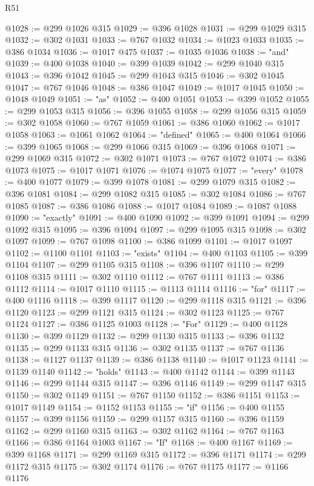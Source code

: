\begin{lexlean}{R51}
\begin{coremodule}
@1028 := @299 @1026 @315
@1029 := @396 @1028
@1031 := @299 @1029 @315
@1032 := @302 @1031
@1033 := @767 @1032
@1034 := @1023 @1033
@1035 := @386 @1034
@1036 := @1017 @475
@1037 := @1035 @1036
@1038 := "and"
@1039 := @400 @1038
@1040 := @399 @1039
@1042 := @299 @1040 @315
@1043 := @396 @1042
@1045 := @299 @1043 @315
@1046 := @302 @1045
@1047 := @767 @1046
@1048 := @386 @1047
@1049 := @1017 @1045
@1050 := @1048 @1049
@1051 := "as"
@1052 := @400 @1051
@1053 := @399 @1052
@1055 := @299 @1053 @315
@1056 := @396 @1055
@1058 := @299 @1056 @315
@1059 := @302 @1058
@1060 := @767 @1059
@1061 := @386 @1060
@1062 := @1017 @1058
@1063 := @1061 @1062
@1064 := "defined"
@1065 := @400 @1064
@1066 := @399 @1065
@1068 := @299 @1066 @315
@1069 := @396 @1068
@1071 := @299 @1069 @315
@1072 := @302 @1071
@1073 := @767 @1072
@1074 := @386 @1073
@1075 := @1017 @1071
@1076 := @1074 @1075
@1077 := "every"
@1078 := @400 @1077
@1079 := @399 @1078
@1081 := @299 @1079 @315
@1082 := @396 @1081
@1084 := @299 @1082 @315
@1085 := @302 @1084
@1086 := @767 @1085
@1087 := @386 @1086
@1088 := @1017 @1084
@1089 := @1087 @1088
@1090 := "exactly"
@1091 := @400 @1090
@1092 := @399 @1091
@1094 := @299 @1092 @315
@1095 := @396 @1094
@1097 := @299 @1095 @315
@1098 := @302 @1097
@1099 := @767 @1098
@1100 := @386 @1099
@1101 := @1017 @1097
@1102 := @1100 @1101
@1103 := "exists"
@1104 := @400 @1103
@1105 := @399 @1104
@1107 := @299 @1105 @315
@1108 := @396 @1107
@1110 := @299 @1108 @315
@1111 := @302 @1110
@1112 := @767 @1111
@1113 := @386 @1112
@1114 := @1017 @1110
@1115 := @1113 @1114
@1116 := "for"
@1117 := @400 @1116
@1118 := @399 @1117
@1120 := @299 @1118 @315
@1121 := @396 @1120
@1123 := @299 @1121 @315
@1124 := @302 @1123
@1125 := @767 @1124
@1127 := @386 @1125 @1003
@1128 := "For"
@1129 := @400 @1128
@1130 := @399 @1129
@1132 := @299 @1130 @315
@1133 := @396 @1132
@1135 := @299 @1133 @315
@1136 := @302 @1135
@1137 := @767 @1136
@1138 := @1127 @1137
@1139 := @386 @1138
@1140 := @1017 @1123
@1141 := @1139 @1140
@1142 := "holds"
@1143 := @400 @1142
@1144 := @399 @1143
@1146 := @299 @1144 @315
@1147 := @396 @1146
@1149 := @299 @1147 @315
@1150 := @302 @1149
@1151 := @767 @1150
@1152 := @386 @1151
@1153 := @1017 @1149
@1154 := @1152 @1153
@1155 := "if"
@1156 := @400 @1155
@1157 := @399 @1156
@1159 := @299 @1157 @315
@1160 := @396 @1159
@1162 := @299 @1160 @315
@1163 := @302 @1162
@1164 := @767 @1163
@1166 := @386 @1164 @1003
@1167 := "If"
@1168 := @400 @1167
@1169 := @399 @1168
@1171 := @299 @1169 @315
@1172 := @396 @1171
@1174 := @299 @1172 @315
@1175 := @302 @1174
@1176 := @767 @1175
@1177 := @1166 @1176

\end{coremodule}
\end{lexlean}
